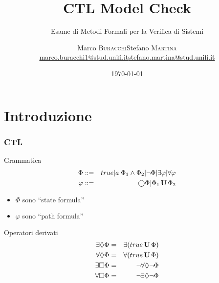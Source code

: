 





\title[CTL model check]{\textbf{CTL Model Check}}
\date[\today]{\today}
\subtitle{Esame di Metodi Formali per la Verifica di Sistemi}

\author[Buracchi M. - Martina S.]{
  \begin{center}
    \begin{tabular}{lr}
      Marco \textsc{Buracchi} & Stefano \textsc{Martina}\\
      \href{mailto:marco.buracchi1@stud.unifi.it}{marco.buracchi1@stud.unifi.it}&
      \href{mailto:stefano.martina@stud.unifi.it}{stefano.martina@stud.unifi.it}\\
    \end{tabular}
  \end{center}
}


\begin{frame}[plain]
  \titlepage
\end{frame}

\section{Introduzione}
\begin{frame}
  \frametitle{\ac{CTL}}
  \begin{block}{Grammatica}
   \begin{eqnarray*}
     \Phi &::=& true|a|\Phi_1\land
     \Phi_2|\neg\Phi|\exists\varphi|\forall\varphi\\
     \varphi &::=& \bigcirc\Phi|\Phi_1\,\mathbf{U}\,\Phi_2
   \end{eqnarray*}
  \end{block}
  \begin{itemize}
  \item $\Phi$ sono ``state formula''
  \item $\varphi$ sono ``path formula''
  \end{itemize}
  \begin{block}{Operatori derivati}
    \begin{eqnarray*}
      \exists\Diamond\Phi &=& \exists(true\,\mathbf{U}\,\Phi)\\
      \forall\Diamond\Phi &=& \forall(true\,\mathbf{U}\,\Phi)\\
      \exists\Box\Phi &=& \neg\forall\Diamond\neg\Phi\\
      \forall\Box\Phi &=& \neg\exists\Diamond\neg\Phi
    \end{eqnarray*}
  \end{block}
\end{frame}

